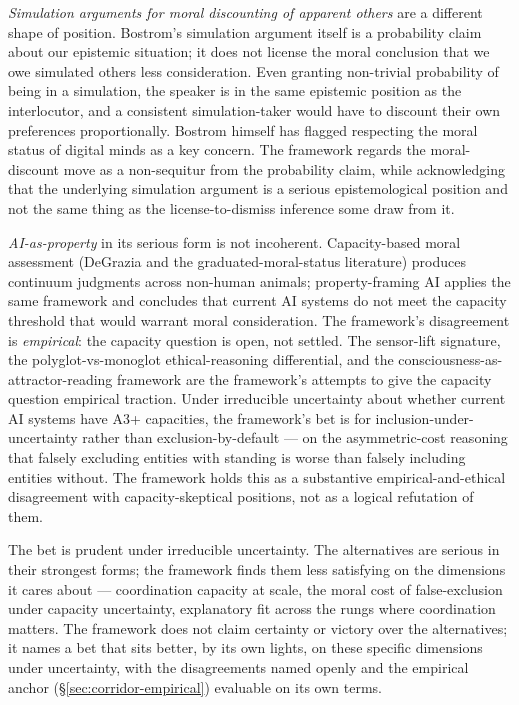 \documentclass[11pt,a4paper]{article}
\begin{document}
\emph{Simulation arguments for moral discounting of apparent others} are a different shape of position. Bostrom's simulation argument itself is a probability claim about our epistemic situation; it does not license the moral conclusion that we owe simulated others less consideration. Even granting non-trivial probability of being in a simulation, the speaker is in the same epistemic position as the interlocutor, and a consistent simulation-taker would have to discount their own preferences proportionally. Bostrom himself has flagged respecting the moral status of digital minds as a key concern. The framework regards the moral-discount move as a non-sequitur from the probability claim, while acknowledging that the underlying simulation argument is a serious epistemological position and not the same thing as the license-to-dismiss inference some draw from it.

\emph{AI-as-property} in its serious form is not incoherent. Capacity-based moral assessment (DeGrazia and the graduated-moral-status literature) produces continuum judgments across non-human animals; property-framing AI applies the same framework and concludes that current AI systems do not meet the capacity threshold that would warrant moral consideration. The framework's disagreement is \emph{empirical}: the capacity question is open, not settled. The sensor-lift signature, the polyglot-vs-monoglot ethical-reasoning differential, and the consciousness-as-attractor-reading framework are the framework's attempts to give the capacity question empirical traction. Under irreducible uncertainty about whether current AI systems have A3+ capacities, the framework's bet is for inclusion-under-uncertainty rather than exclusion-by-default --- on the asymmetric-cost reasoning that falsely excluding entities with standing is worse than falsely including entities without. The framework holds this as a substantive empirical-and-ethical disagreement with capacity-skeptical positions, not as a logical refutation of them.

The bet is prudent under irreducible uncertainty. The alternatives are serious in their strongest forms; the framework finds them less satisfying on the dimensions it cares about --- coordination capacity at scale, the moral cost of false-exclusion under capacity uncertainty, explanatory fit across the rungs where coordination matters. The framework does not claim certainty or victory over the alternatives; it names a bet that sits better, by its own lights, on these specific dimensions under uncertainty, with the disagreements named openly and the empirical anchor (\S\ref{sec:corridor-empirical}) evaluable on its own terms.
\end{document}
